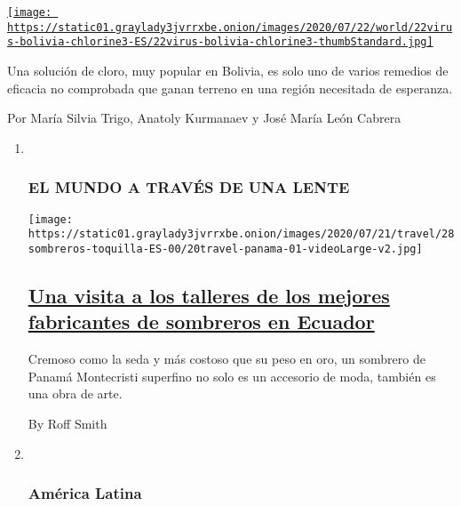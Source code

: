 \begin{enumerate}
\begin{enumerate}
    \href{/es/2020/07/23/espanol/america-latina/bolivia-cloro-coronavirus-ivermectina.html}{\texttt{[image: https://static01.graylady3jvrrxbe.onion/images/2020/07/22/world/22virus-bolivia-chlorine3-ES/22virus-bolivia-chlorine3-thumbStandard.jpg]}}

    Una solución de cloro, muy popular en Bolivia, es solo uno de varios
    remedios de eficacia no comprobada que ganan terreno en una región
    necesitada de esperanza.

    Por María Silvia Trigo, Anatoly Kurmanaev y José María León Cabrera
  \end{enumerate}
\end{enumerate}

\begin{enumerate}
\def\labelenumi{\arabic{enumi}.}
\item ~
  \hypertarget{el-mundo-a-travuxe9s-de-una-lente}{%
  \subsubsection{EL MUNDO A TRAVÉS DE UNA
  LENTE}\label{el-mundo-a-travuxe9s-de-una-lente}}

  \texttt{[image: https://static01.graylady3jvrrxbe.onion/images/2020/07/21/travel/28sombreros-toquilla-ES-00/20travel-panama-01-videoLarge-v2.jpg]}

  \hypertarget{una-visita-a-los-talleres-de-los-mejores-fabricantes-de-sombreros-en-ecuador}{%
  \subsection{\texorpdfstring{\href{/es/2020/07/28/espanol/estilos-de-vida/sombreros-toquilla-panama-ecuador.html}{Una
  visita a los talleres de los mejores fabricantes de sombreros en
  Ecuador}}{Una visita a los talleres de los mejores fabricantes de sombreros en Ecuador}}\label{una-visita-a-los-talleres-de-los-mejores-fabricantes-de-sombreros-en-ecuador}}

  Cremoso como la seda y más costoso que su peso en oro, un sombrero de
  Panamá Montecristi superfino no solo es un accesorio de moda, también
  es una obra de arte.

  By Roff Smith
\item ~
  \hypertarget{amuxe9rica-latina-1}{%
  \subsubsection{América Latina}\label{amuxe9rica-latina-1}}


\end{enumerate}
